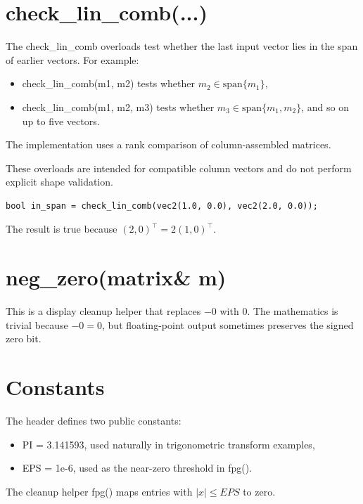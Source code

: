 \documentclass[11pt,a4paper,openany]{book}
\def\code#1{#1}%
\DeclareRobustCommand{\code}[1]{\texttt{\detokenize{#1}}}
\begin{document}
\section{\code{check_lin_comb(...)}}
The \code{check_lin_comb} overloads test whether the last input vector lies in the span of earlier vectors.
For example:
\begin{itemize}
    \item \code{check_lin_comb(m1, m2)} tests whether \(m_2 \in \text{span}\{m_1\}\),
    \item \code{check_lin_comb(m1, m2, m3)} tests whether \(m_3 \in \text{span}\{m_1,m_2\}\), and so on up to five vectors.
\end{itemize}
The implementation uses a rank comparison of column-assembled matrices.

\begin{techbox}
These overloads are intended for compatible column vectors and do not perform explicit shape validation.
\end{techbox}

\begin{examplebox}[Example]
\begin{lstlisting}[style=eldaCpp]
bool in_span = check_lin_comb(vec2(1.0, 0.0), vec2(2.0, 0.0));
\end{lstlisting}
The result is \code{true} because \((2,0)^\top = 2(1,0)^\top\).
\end{examplebox}

\section{\code{neg_zero(matrix\& m)}}
This is a display cleanup helper that replaces \(-0\) with \(0\). The mathematics is trivial because \(-0 = 0\), but floating-point output sometimes preserves the signed zero bit.

\section{Constants}
The header defines two public constants:
\begin{itemize}
    \item \code{PI = 3.141593}, used naturally in trigonometric transform examples,
    \item \code{EPS = 1e-6}, used as the near-zero threshold in \code{fpg()}.
\end{itemize}
The cleanup helper \code{fpg()} maps entries with \(|x| \le \code{EPS}\) to zero.
\end{document}
